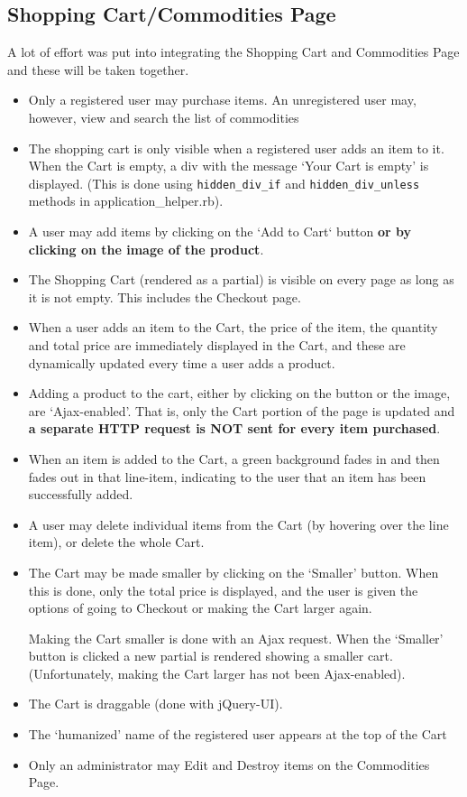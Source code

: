 \documentclass[11pt]{article}
\begin{document}
\subsection{Shopping Cart/Commodities Page}
A lot of effort was put into integrating the Shopping Cart and Commodities Page
and these will be taken together.
\begin{itemize}
\item[] Only a registered user may purchase items. 
An unregistered user may, however, view and search the list of commodities
\item[] The shopping cart is only visible when a registered user adds an item to it.  When the
Cart is empty, a div with the message `Your Cart is empty' is displayed. (This is done using
\verb|hidden_div_if| and \verb|hidden_div_unless| methods in application\_helper.rb).
\item[] A user may add items by clicking on the `Add to Cart` button 
\textbf{or by clicking on the image of the product}.
\item[] The Shopping Cart (rendered as a partial) is visible on every page as long as it is not empty. This 
includes the Checkout page.
\item[] When a user adds an item to the Cart, the price of the item, the quantity and total
price are immediately displayed in the Cart, and these are dynamically updated every time a user adds a product.
\item[] Adding a product to the cart, either by clicking on the button or the image, are `Ajax-enabled'. That is, only
the Cart portion of the page is updated and \textbf{a separate HTTP request is NOT sent for every item purchased}.
\item[] When an item is added to the Cart, a green background fades in and then fades out in that line-item, indicating
to the user that an item has been successfully added. 
\item[] A user may delete individual items from the Cart (by hovering over the line item), or delete the whole Cart.
\item[] The Cart may be made smaller by clicking on the `Smaller' button.  When this is done, only the total price is
displayed, and the user is given the options of going to Checkout or making the Cart larger again.
  
Making the Cart smaller is done with an Ajax request. When the `Smaller' button is clicked a new partial is rendered 
showing a smaller cart. (Unfortunately, making the Cart larger has not been Ajax-enabled). 
\item[] The Cart is draggable (done with jQuery-UI). 
\item[] The `humanized' name of the registered user appears at the top of the Cart
\item[] Only an administrator may Edit and Destroy items on the Commodities Page. 
\end{itemize}
\end{document}
